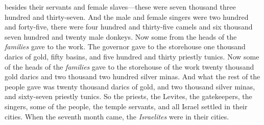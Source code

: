 \begin{biblechapter}
\verse besides their servants and female slaves—these were seven thousand three hundred and thirty-seven. And the male and female singers were two hundred and forty-five,
\verse {} there were four hundred and thirty-five camels and six thousand seven hundred and twenty male donkeys.
\verse Now some from the heads of the \textit{families} gave to the work. The governor gave to the storehouse one thousand darics of gold, fifty basins, and five hundred and thirty priestly tunics.
\verse Now some of the heads of the \textit{families} gave to the storehouse of the work twenty thousand gold darics and two thousand two hundred silver minas.
\verse And what the rest of the people gave was twenty thousand darics of gold, and two thousand silver minas, and sixty-seven priestly tunics.
\verse So the priests, the Levites, the gatekeepers, the singers, some of the people, the temple servants, and all Israel settled in their cities. When the seventh month came, the \textit{Israelites} were in their cities.
\end{biblechapter}

